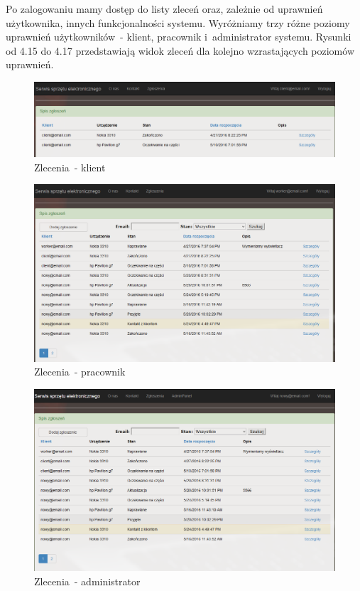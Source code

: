 \documentclass[a4paper,11pt]{article}
\begin{document}
Po zalogowaniu mamy dostęp do listy zleceń oraz, zależnie od uprawnień użytkownika, innych funkcjonalności systemu. Wyróżniamy trzy różne poziomy uprawnień użytkowników~- klient, pracownik i~administrator systemu. Rysunki od 4.15 do 4.17 przedstawiają widok zleceń dla kolejno wzrastających poziomów uprawnień.

\begin{figure}[H]
	\centering
	\includegraphics[width=\textwidth,height=0.2\textheight]{serwisKlient.png}
	\caption{Zlecenia~- klient}
\end{figure}
\begin{figure}[H]
	\centering
	\includegraphics[width=\textwidth,height=0.6\textheight]{serwisWorker.png}
	\caption{Zlecenia~- pracownik}
\end{figure}
\begin{figure}[H]
	\centering
	\includegraphics[width=\textwidth,height=0.6\textheight]{serwisZlecenia.png}
	\caption{Zlecenia~- administrator}
\end{figure}
\end{document}
